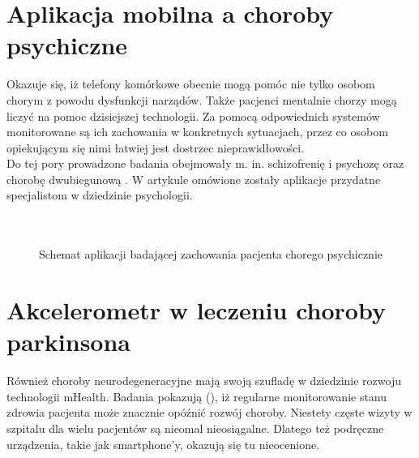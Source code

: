 \section{Aplikacja mobilna a choroby psychiczne}
Okazuje się, iż telefony komórkowe obecnie mogą pomóc nie tylko osobom chorym z powodu dysfunkcji narządów. Także pacjenci mentalnie chorzy mogą liczyć na pomoc dzisiejszej technologii. Za pomocą odpowiednich systemów monitorowane są ich zachowania w konkretnych sytuacjach, przez co osobom opiekującym się nimi łatwiej jest dostrzec nieprawidłowości.\\
Do tej pory prowadzone badania obejmowały m. in. schizofrenię i psychozę oraz chorobę dwubiegunową \cite{IJOMHSPawelProciow2012Mobilepsychiatry:towardsimprovingthecareforbipolardisorderScience&TechnologyLifeSciences&BiomedicinePsychiatryPSYCHIATRYSSCIAMBULATORYASSESSMENTCIRCADIAN-RHYTHMSMENTAL-DISORDERSDAILY-LIFEPSYCHOLOGYCREATIVITYMOVEMENTBURDENSLEEP}. W artykule \cite{JoPNHSElias2014MobileAppsforPsychiatricNursesPsychiatric-mentalhealthnursingSmartphonesHandheldcomputersSoftware} omówione zostały aplikacje przydatne specjalistom w dziedzinie psychologii. \\ \\ \\
\begin{figure}[ht!]
  \centering
  \caption{Schemat aplikacji badającej zachowania pacjenta chorego psychicznie}
\end{figure}
\section{Akcelerometr  w leczeniu choroby parkinsona}
Również choroby neurodegeneracyjne mają swoją szufladę w dziedzinie rozwoju technologii mHealth. Badania pokazują (\cite{AICPSSanders2013RemotesmartphonemonitoringformanagementofParkinsonsDiseaseEEGaccelerationactivitymonitoringelectroencephalogrammobilecomputingsensorsmart-phonewatchwrist}), iż regularne monitorowanie stanu zdrowia pacjenta może znacznie opóźnić rozwój choroby. Niestety częste wizyty w szpitalu dla wielu pacjentów są nieomal nieosiągalne. Dlatego też podręczne urządzenia, takie jak smartphone'y, okazują się tu nieocenione.